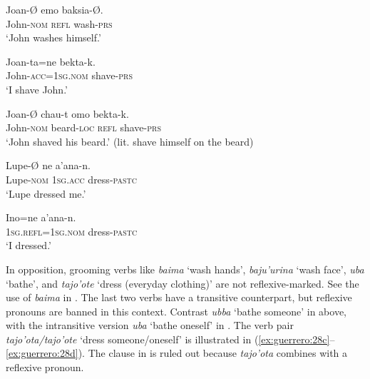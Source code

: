 \documentclass[output=paper]{langscibook}
\begin{document}
\ea%
    \label{ex:guerrero:27}

\ea
\label{ex:guerrero:27a}
\gll Joan-Ø  emo  baksia-Ø.\\
  John-\textsc{nom}  \textsc{refl}  wash\textsc{{}-prs}\\
\glt ‘John washes himself.’

\ex
\label{ex:guerrero:27b}
\gll Joan-ta=ne    bekta-k.\\
  John-\textsc{acc=1sg.nom}  shave\textsc{{}-prs}\\
\glt ‘I shave John.’

\ex
\label{ex:guerrero:27c}
\gll Joan-Ø    chau-t   omo   bekta-k.\\
  John-\textsc{nom}  beard-\textsc{loc}  \textsc{refl}   shave\textsc{{}-prs}\\
\glt ‘John shaved his beard.’ (lit. shave himself on the beard)

\ex
\label{ex:guerrero:27d}
\gll Lupe-Ø    ne   a’ana-n.\\
  Lupe-\textsc{nom}  \textsc{1sg.acc}  dress\textsc{{}-pastc}\\
\glt ‘Lupe dressed me.’

\ex
\label{ex:guerrero:27e}
\gll Ino=ne a’ana-n.\\
  \textsc{1sg.refl=1sg.nom}  dress\textsc{{}-pastc}\\
\glt ‘I dressed.’
\z
\z



In opposition, grooming verbs like \textit{baima} ‘wash hands’, \textit{baju’urina} ‘wash face’, \textit{uba} ‘bathe’, and \textit{tajo’ote} ‘dress (everyday clothing)’ are not reflexive-marked. See the use of \textit{baima} in . The last two verbs have a transitive counterpart, but reflexive pronouns are banned in this context. Contrast \textit{ubba} ‘bathe someone’ in  above, with the intransitive version \textit{uba} ‘bathe oneself’ in . The verb pair \textit{tajo’ota/tajo’ote} ‘dress someone/oneself’ is illustrated in (\ref{ex:guerrero:28c}--\ref{ex:guerrero:28d}). The clause in  is ruled out because \textit{tajo’ota} combines with a reflexive pronoun.



\ea%
    \label{ex:guerrero:28}

\end{document}
